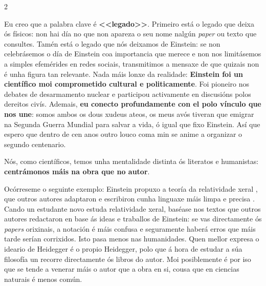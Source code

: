 \begin{multicols}{2}
\textcolor{Resalte}{\hrulefill}



Eu creo que a palabra clave é \textbf{<<legado>>}. Primeiro está o legado que 
deixa ós físicos: non hai día no que non apareza o seu nome nalgún \emph{paper}
ou texto que consultes. Tamén está o legado que nós deixamos de Einstein: se 
non celebrásemos o día de Einstein coa importancia que merece e non nos limitásemos 
a simples efemérides en redes sociais, transmitimos a mensaxe de que quizais 
non é unha figura tan relevante. Nada máis lonxe da realidade: \textbf{Einstein 
foi un científico moi comprometido cultural e politicamente}. Foi pioneiro nos 
debates de desarmamento nuclear e participou activamente en discusións polos 
dereitos civís. Ademais, \textbf{eu conecto profundamente con el polo vínculo 
que nos une}: somos ambos os dous xudeus ateos, os meus avós tiveran que emigrar 
na Segunda Guerra Mundial para salvar a vida, ó igual que fixo Einstein. Así 
que espero que dentro de cen anos outro louco coma min se anime a organizar o segundo centenario.





Nós, como científicos, temos unha mentalidade distinta ós literatos e humanistas: 
\textbf{centrámonos máis na obra que no autor}. 

Ocórreseme o seguinte exemplo: Einstein propuxo a teoría da relatividade xeral
, que outros autores adaptaron e escribiron cunha linguaxe máis limpa e precisa
. Cando un estudante novo estuda relatividade xeral, baséase nos textos que outros 
autores redactaron en base ás ideas e traballos de Einstein: se vas directamente 
ós \textit{papers} orixinais, a notación é máis confusa e seguramente haberá 
erros que máis tarde serían corrixidos. Isto pasa menos nas humanidades. Quen 
mellor expresa o ideario de Heidegger é o propio Heidegger, polo que á hora de 
estudar a súa filosofía un recorre directamente ós libros do autor. Moi posiblemente 
é por iso que se tende a venerar máis o autor que a obra en si, cousa que en 
ciencias naturais é menos común.


\end{multicols}
